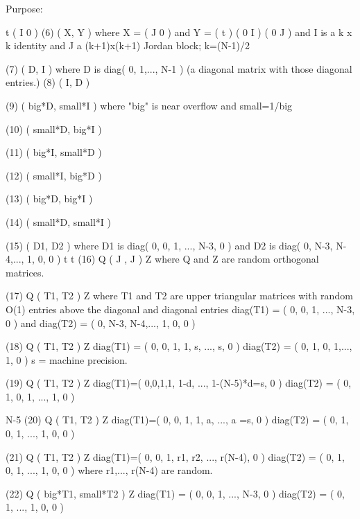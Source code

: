 \begin{DoxyParagraph}{Purpose\+: }
\begin{DoxyVerb}
                                     t                ( I   0  )
 (6)  ( X, Y )         where  X = ( J   0  )  and Y = (      t )
                                  ( 0   I  )          ( 0   J  )
                       and I is a k x k identity and J a (k+1)x(k+1)
                       Jordan block; k=(N-1)/2

 (7)  ( D, I )         where D is diag( 0, 1,..., N-1 ) (a diagonal
                       matrix with those diagonal entries.)
 (8)  ( I, D )

 (9)  ( big*D, small*I ) where "big" is near overflow and small=1/big

 (10) ( small*D, big*I )

 (11) ( big*I, small*D )

 (12) ( small*I, big*D )

 (13) ( big*D, big*I )

 (14) ( small*D, small*I )

 (15) ( D1, D2 )        where D1 is diag( 0, 0, 1, ..., N-3, 0 ) and
                        D2 is diag( 0, N-3, N-4,..., 1, 0, 0 )
           t   t
 (16) Q ( J , J ) Z     where Q and Z are random orthogonal matrices.

 (17) Q ( T1, T2 ) Z    where T1 and T2 are upper triangular matrices
                        with random O(1) entries above the diagonal
                        and diagonal entries diag(T1) =
                        ( 0, 0, 1, ..., N-3, 0 ) and diag(T2) =
                        ( 0, N-3, N-4,..., 1, 0, 0 )

 (18) Q ( T1, T2 ) Z    diag(T1) = ( 0, 0, 1, 1, s, ..., s, 0 )
                        diag(T2) = ( 0, 1, 0, 1,..., 1, 0 )
                        s = machine precision.

 (19) Q ( T1, T2 ) Z    diag(T1)=( 0,0,1,1, 1-d, ..., 1-(N-5)*d=s, 0 )
                        diag(T2) = ( 0, 1, 0, 1, ..., 1, 0 )

                                                        N-5
 (20) Q ( T1, T2 ) Z    diag(T1)=( 0, 0, 1, 1, a, ..., a   =s, 0 )
                        diag(T2) = ( 0, 1, 0, 1, ..., 1, 0, 0 )

 (21) Q ( T1, T2 ) Z    diag(T1)=( 0, 0, 1, r1, r2, ..., r(N-4), 0 )
                        diag(T2) = ( 0, 1, 0, 1, ..., 1, 0, 0 )
                        where r1,..., r(N-4) are random.

 (22) Q ( big*T1, small*T2 ) Z    diag(T1) = ( 0, 0, 1, ..., N-3, 0 )
                                  diag(T2) = ( 0, 1, ..., 1, 0, 0 )


\end{DoxyVerb}
\end{DoxyParagraph}
